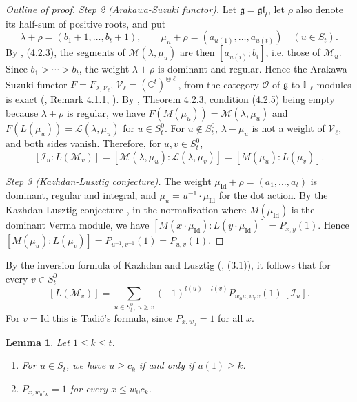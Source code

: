 \documentclass[a4paper,12pt,leqno]{amsart}
\newcommand{\caI}{\mathcal{I}}
\newcommand{\caM}{\mathcal{M}}
\newcommand{\caO}{\mathcal{O}}
\theoremstyle{plain}
\newtheorem{lemma}[thm]{Lemma}
\theoremstyle{definition}
\theoremstyle{definition}
\newcommand{\Id}{\mathrm{Id}}
\begin{document}
\begin{proof}[Outline of proof]
\emph{Step 2 (Arakawa-Suzuki functor).} Let $\mathfrak{g}=\mathfrak{gl}_t$, let $\rho$ also denote
its half-sum
 of positive roots, and put
\[\lambda+\rho=(b_1+1,\ldots,b_t+1),\qquad \mu_u+\rho=(a_{u(1)},\ldots,a_{u(t)})\quad(u\in S_t).\]
By \cite{BC15}, (4.2.3), the segments of $\mathcal{M}(\lambda,\mu_u)$ are then $[a_{u(i)};b_i]$,
i.e. those of $\caM_u$.
Since $b_1>\cdots>b_t$, the weight $\lambda+\rho$ is dominant and regular. Hence the Arakawa-Suzuki functor
 $F=F_{\lambda,\mathcal{V}_\ell}$, $\mathcal{V}_\ell=(\mathbb{C}^t)^{\otimes\ell}$, from the category $\caO$
 of $\mathfrak{g}$ to $\mathbb{H}_\ell$-modules is exact (\cite{BC15}, Remark 4.1.1, \cite{AS98}).
 By \cite{BC15}, Theorem 4.2.3, condition (4.2.5) being empty because $\lambda+\rho$ is regular,
 we have $F(M(\mu_u))=\mathcal{M}(\lambda,\mu_u)$ and $F(L(\mu_u))=\mathcal{L}(\lambda,\mu_u)$
 for $u\in S_t^0$. For $u\notin S_t^0$, $\lambda-\mu_u$ is not a weight of $\mathcal{V}_\ell$, and
  both sides vanish. Therefore, for $u,v\in S_t^0$,
\[[\caI_u:L(\caM_v)]=[\mathcal{M}(\lambda,\mu_u):\mathcal{L}(\lambda,\mu_v)]=[M(\mu_u):L(\mu_v)].\]

\emph{Step 3 (Kazhdan-Lusztig conjecture).} The weight $\mu_{\Id}+\rho=(a_1,\ldots,a_t)$ is dominant,
regular and integral, and $\mu_u=u^{-1}\cdot\mu_{\Id}$ for the dot action. By the Kazhdan-Lusztig
conjecture \cite{BB81, BK81}, in the normalization where $M(\mu_{\Id})$ is the dominant Verma module,
we have $[M(x\cdot\mu_{\Id}):L(y\cdot\mu_{\Id})]=P_{x,y}(1)$. Hence
$[M(\mu_u):L(\mu_v)]=P_{u^{-1},v^{-1}}(1)=P_{u,v}(1)$.
\end{proof}

By the inversion formula of Kazhdan and Lusztig (\cite{KL79}, (3.1)), it follows that for every $v\in S_t^0$
\begin{equation}\label{eq:inverseKL} [L(\caM_v)]=\sum_{u\in S_t^0,\ u\geq
v}(-1)^{l(u)-l(v)}P_{w_0u,w_0v}(1)\,[\caI_u].\end{equation}
For $v=\Id$ this is Tadi\'c's formula, since $P_{x,w_0}=1$ for all $x$.

\begin{lemma}\label{lem:ck} Let $1\leq k\leq t$.
\begin{enumerate}
\item[(i)] For $u\in S_t$, we have $u\geq c_k$ if and only if $u(1)\geq k$.
\item[(ii)] $P_{x,w_0c_k}=1$ for every $x\leq w_0c_k$.
\end{enumerate}
\end{lemma}
\end{document}
